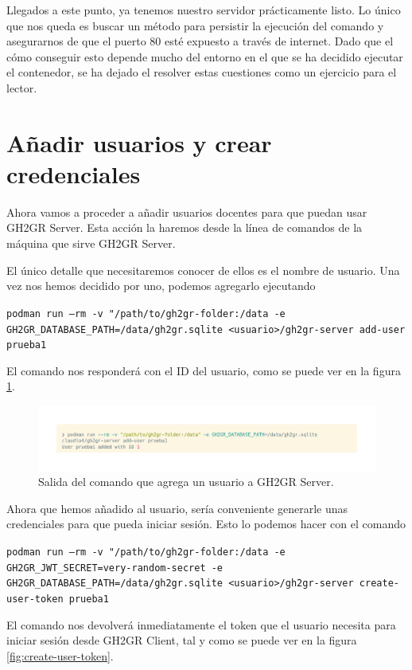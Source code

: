 Llegados a este punto, ya tenemos nuestro servidor prácticamente listo. Lo único que nos queda es buscar un método para persistir la ejecución del comando y asegurarnos de que el puerto 80 esté expuesto a través de internet. Dado que el cómo conseguir esto depende mucho del entorno en el que se ha decidido ejecutar el contenedor, se ha dejado el resolver estas cuestiones como un ejercicio para el lector.


\section{Añadir usuarios y crear credenciales} \label{title:add-user}
Ahora vamos a proceder a añadir usuarios docentes para que puedan usar GH2GR Server. Esta acción la haremos desde la línea de comandos de la máquina que sirve GH2GR Server.
\begin{sloppypar}
El único detalle que necesitaremos conocer de ellos es el nombre de usuario. Una vez nos hemos decidido por uno, podemos agregarlo ejecutando 

\texttt{podman run --rm -v "/path/to/gh2gr-folder:/data -e GH2GR\_DATABASE\_PATH=/data/gh2gr.sqlite <usuario>/gh2gr-server add-user prueba1}

El comando nos responderá con el ID del usuario, como se puede ver en la figura \ref{fig:add-user}.
\end{sloppypar}

\begin{figure}
    \centering
    \includegraphics[width=0.75\linewidth]{images/add-user.png}
    \caption{Salida del comando que agrega un usuario a GH2GR Server.}
    \label{fig:add-user}
\end{figure}

\begin{sloppypar}
Ahora que hemos añadido al usuario, sería conveniente generarle unas credenciales para que pueda iniciar sesión. Esto lo podemos hacer con el comando 

\texttt{podman run --rm -v "/path/to/gh2gr-folder:/data -e GH2GR\_JWT\_SECRET=very-random-secret -e GH2GR\_DATABASE\_PATH=/data/gh2gr.sqlite <usuario>/gh2gr-server create-user-token prueba1}

El comando nos devolverá inmediatamente el token que el usuario necesita para iniciar sesión desde GH2GR Client, tal y como se puede ver en la figura \ref{fig:create-user-token}.
\end{sloppypar}

